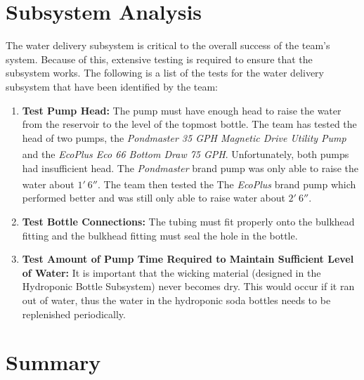\documentclass[12pt]{article}
\let\supscr=\textsuperscript
\begin{document}
\section{Subsystem Analysis}


The water delivery subsystem is critical to the overall success of the team's system. Because of
this, extensive testing is required to ensure that the subsystem works. The following is a list of
the tests for the water delivery subsystem that have been identified by the team:

\begin{enumerate}

    \item \textbf{Test Pump Head:} The pump must have enough head to raise the water from the
        reservoir to the level of the topmost bottle. The team has tested the head of two pumps, the
        \textit{Pondmaster 35 GPH Magnetic Drive Utility Pump} and the
        \textit{EcoPlus\supscr{\textregistered} Eco 66 Bottom Draw 75 GPH}. Unfortunately, both
        pumps had insufficient head. The \textit{Pondmaster} brand pump was only able to raise the
        water about $1'\ 6''$. The team then tested the The \textit{EcoPlus\supscr{\textregistered}}
        brand pump which performed better and was still only able to raise water about $2'\ 6''$.

    \item \textbf{Test Bottle Connections:} The tubing must fit properly onto the bulkhead fitting
        and the bulkhead fitting must seal the hole in the bottle.

    \item \textbf{Test Amount of Pump Time Required to Maintain Sufficient Level of Water:} It is
        important that the wicking material (designed in the Hydroponic Bottle Subsystem) never
        becomes dry. This would occur if it ran out of water, thus the water in the hydroponic soda
        bottles needs to be replenished periodically.

\end{enumerate}

\section{Summary}
\end{document}
